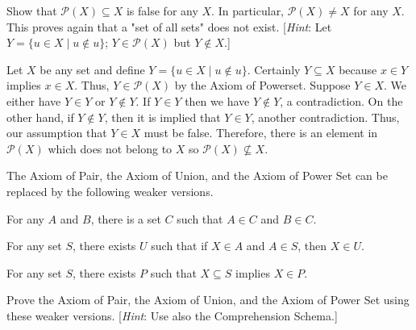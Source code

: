 \documentclass[class=report, crop=false]{standalone}
\begin{document}
  \begin{problem}
    Show that \(\mathcal{P}(X) \subseteq X\) is false for any \(X\). In particular, \(\mathcal{P}(X) \neq X\) for any \(X\). This proves again that a "set of all sets" does not exist.
    [\textit{Hint}: Let \(Y = \{u \in X \mid u \notin u\}\); \(Y \in \mathcal{P}(X)\) but \(Y \notin X\).]
  \end{problem}

  \begin{solution}
    Let \(X\) be any set and define \(Y = \{u \in X \mid u \notin u\}\). Certainly \(Y \subseteq X\) because \(x \in Y\) implies \(x \in X\). Thus, \(Y \in \mathcal{P}(X)\) by the Axiom of Powerset.
    Suppose \(Y \in X\). We either have \(Y \in Y\) or \(Y \notin Y\). If \(Y \in Y\) then we have \(Y \notin Y\), a contradiction. On the other hand, if \(Y \notin Y\), then it is implied that \(Y \in Y\), another contradiction.
    Thus, our assumption that \(Y \in X\) must be false. Therefore, there is an element in \(\mathcal{P}(X)\) which does not belong to \(X\) so \(\mathcal{P}(X) \not\subseteq X\).
  \end{solution}


  \begin{problem}
    The Axiom of Pair, the Axiom of Union, and the Axiom of Power Set can be replaced by the following weaker versions.
    \begin{axiom}
      For any \(A\) and \(B\), there is a set \(C\) such that \(A \in C\) and \(B \in C\).
    \end{axiom}
    \begin{axiom}
      For any set \(S\), there exists \(U\) such that if \(X \in A\) and \(A \in S\), then \(X \in U\).
    \end{axiom}
    \begin{axiom}
      For any set \(S\), there exists \(P\) such that \(X \subseteq S\) implies \(X \in P\).
    \end{axiom}
    Prove the Axiom of Pair, the Axiom of Union, and the Axiom of Power Set using these weaker versions. [\textit{Hint}: Use also the Comprehension Schema.]
  \end{problem}
\end{document}
